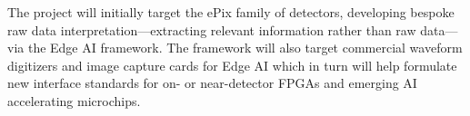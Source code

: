 \documentclass{article}
\begin{document}

The project will initially target the ePix family of detectors, developing bespoke raw data interpretation---extracting relevant information rather than raw data---via the Edge AI framework. 
The framework will also target commercial waveform digitizers and image capture cards for Edge AI which in turn will help formulate new interface standards for on- or near-detector FPGAs and emerging AI accelerating microchips.





\end{document}
